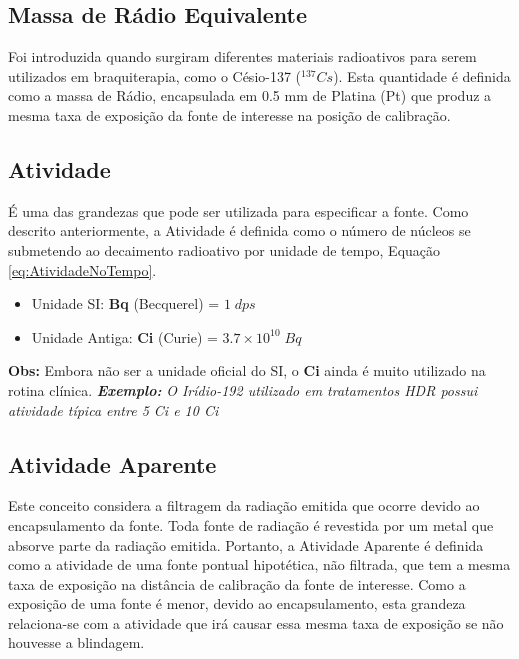 \documentclass[11pt,a4paper]{article}
\begin{document}
		\subsection{Massa de Rádio Equivalente}

			Foi introduzida quando surgiram diferentes materiais radioativos para serem utilizados em braquiterapia, como o Césio-137 (${}^{137}Cs$). Esta quantidade é definida como a massa de Rádio, encapsulada em 0.5 mm de Platina (Pt) que produz a mesma taxa de exposição da fonte de interesse na posição de calibração.

		\subsection{Atividade}

			É uma das grandezas que pode ser utilizada para especificar a fonte. Como descrito anteriormente, a Atividade é definida como o número de núcleos se submetendo ao decaimento radioativo por unidade de tempo, Equação \ref{eq:AtividadeNoTempo}.

			\begin{itemize}
				\item Unidade SI: \textbf{Bq} (Becquerel) = $1\;dps$
				\item Unidade Antiga: \textbf{Ci} (Curie) = $3.7 \times 10^{10}\; Bq$
			\end{itemize}

			\textbf{\textbf{\textcolor{CarnationPink}{Obs:} } }Embora não ser a unidade oficial do SI, o \textbf{Ci} ainda é muito utilizado na rotina clínica. \textit{\textbf{\textcolor{CarnationPink}{Exemplo:}}} \textit{O Irídio-192 utilizado em tratamentos HDR possui atividade típica entre 5 Ci e 10 Ci}

		\subsection{Atividade Aparente}

			Este conceito considera a filtragem da radiação emitida que ocorre devido ao encapsulamento da fonte. Toda fonte de radiação é revestida por um metal que absorve parte da radiação emitida. Portanto, a Atividade Aparente é definida como a atividade de uma fonte pontual hipotética, não filtrada, que tem a mesma taxa de exposição na distância de calibração da fonte de interesse. Como a exposição de uma fonte é menor, devido ao encapsulamento, esta grandeza relaciona-se com a atividade que irá causar essa mesma taxa de exposição se não houvesse a blindagem.
	
\end{document}
